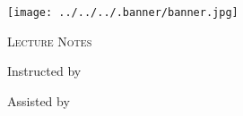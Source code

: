 \documentclass[a4paper,11pt,twoside]{report}
\begin{document}
{\centering
	\texttt{[image: ../../../.banner/banner.jpg]}\par\vspace{1cm}
	{\scshape\LARGE Lecture Notes \par}\vspace{1cm}{\huge\bfseries class<++>\par}
	\vspace{.5cm}{\large term<++> \par}\vspace{.5cm}{\Large\itshape Jasper Runco \par}
	\vfill Instructed by \par{\large \itshape <++> \par} Assisted by \par
	{\large \itshape <++> \par}} \newpage \tableofcontents \pagestyle{plain}
	
\end{document}
